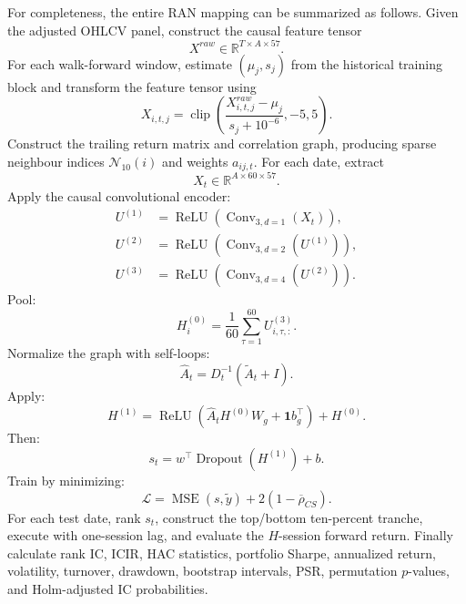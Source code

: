 \documentclass[10pt]{article}
\begin{document}
For completeness, the entire RAN mapping can be summarized as follows. Given the adjusted OHLCV panel, construct the causal feature tensor
\begin{equation}
X^{raw}\in\mathbb{R}^{T\times A\times57}.
\end{equation}
For each walk-forward window, estimate $(\mu_j,s_j)$ from the historical training block and transform the feature tensor using
\begin{equation}
X_{i,t,j}
=
\operatorname{clip}
\left(
\frac{X^{raw}_{i,t,j}-\mu_j}{s_j+10^{-6}},
-5,5
\right).
\end{equation}
Construct the trailing return matrix and correlation graph, producing sparse neighbour indices $\mathcal{N}_{10}(i)$ and weights $a_{ij,t}$. For each date, extract
\begin{equation}
X_t\in\mathbb{R}^{A\times60\times57}.
\end{equation}
Apply the causal convolutional encoder:
\begin{align}
U^{(1)}&=\operatorname{ReLU}(\operatorname{Conv}_{3,d=1}(X_t)),\\
U^{(2)}&=\operatorname{ReLU}(\operatorname{Conv}_{3,d=2}(U^{(1)})),\\
U^{(3)}&=\operatorname{ReLU}(\operatorname{Conv}_{3,d=4}(U^{(2)})).
\end{align}
Pool:
\begin{equation}
H^{(0)}_i=\frac1{60}\sum_{\tau=1}^{60}U^{(3)}_{i,\tau,:}.
\end{equation}
Normalize the graph with self-loops:
\begin{equation}
\hat A_t=
D_t^{-1}(\tilde A_t+I).
\end{equation}
Apply:
\begin{equation}
H^{(1)}
=
\operatorname{ReLU}
(\hat A_tH^{(0)}W_g+\mathbf1b_g^\top)+H^{(0)}.
\end{equation}
Then:
\begin{equation}
s_t=w^\top\operatorname{Dropout}(H^{(1)})+b.
\end{equation}
Train by minimizing:
\begin{equation}
\mathcal L
=
\operatorname{MSE}(s,\tilde y)
+
2(1-\overline{\rho}_{CS}).
\end{equation}
For each test date, rank $s_t$, construct the top/bottom ten-percent tranche, execute with one-session lag, and evaluate the $H$-session forward return. Finally calculate rank IC, ICIR, HAC statistics, portfolio Sharpe, annualized return, volatility, turnover, drawdown, bootstrap intervals, PSR, permutation $p$-values, and Holm-adjusted IC probabilities.
\end{document}

